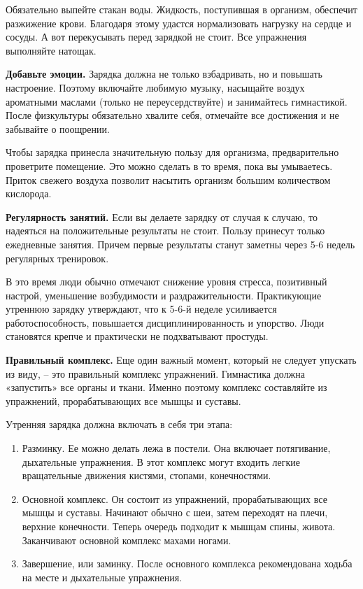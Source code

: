 Обязательно выпейте стакан воды. Жидкость, поступившая в организм, обеспечит разжижение крови. Благодаря этому удастся нормализовать нагрузку на сердце и сосуды. А вот перекусывать перед зарядкой не стоит. Все упражнения выполняйте натощак.

\textbf{Добавьте эмоции.} Зарядка должна не только взбадривать, но и повышать настроение. Поэтому включайте любимую музыку, насыщайте воздух ароматными маслами (только не переусердствуйте) и занимайтесь гимнастикой. После физкультуры обязательно хвалите себя, отмечайте все достижения и не забывайте о поощрении.

Чтобы зарядка принесла значительную пользу для организма, предварительно проветрите помещение. Это можно сделать в то время, пока вы умываетесь. Приток свежего воздуха позволит насытить организм большим количеством кислорода.

\textbf{Регулярность занятий.} Если вы делаете зарядку от случая к случаю, то надеяться на положительные результаты не стоит. Пользу принесут только ежедневные занятия. Причем первые результаты станут заметны через 5-6 недель регулярных тренировок.

В это время люди обычно отмечают снижение уровня стресса, позитивный настрой, уменьшение возбудимости и раздражительности. Практикующие утреннюю зарядку утверждают, что к 5-6-й неделе усиливается работоспособность, повышается дисциплинированность и упорство. Люди становятся крепче и практически не подхватывают простуды.

\textbf{Правильный комплекс.} Еще один важный момент, который не следует упускать из виду, – это правильный комплекс упражнений. Гимнастика должна «запустить» все органы и ткани. Именно поэтому комплекс составляйте из упражнений, прорабатывающих все мышцы и суставы.



Утренняя зарядка должна включать в себя три этапа:
\begin{enumerate}
    \item Разминку. Ее можно делать лежа в постели. Она включает потягивание, дыхательные упражнения. В этот комплекс могут входить легкие вращательные движения кистями, стопами, конечностями.
    \item Основной комплекс. Он состоит из упражнений, прорабатывающих все мышцы и суставы. Начинают обычно с шеи, затем переходят на плечи, верхние конечности. Теперь очередь подходит к мышцам спины, живота. Заканчивают основной комплекс махами ногами.
    \item Завершение, или заминку. После основного комплекса рекомендована ходьба на месте и дыхательные упражнения.
\end{enumerate}



